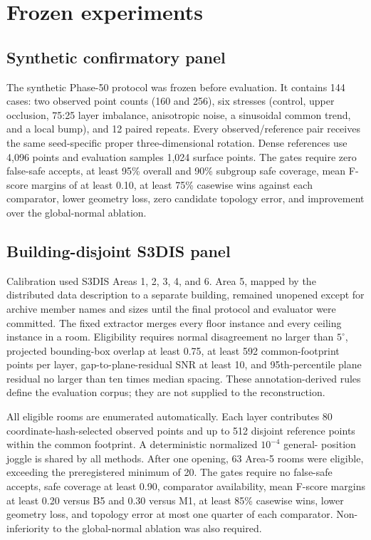 \documentclass[12pt,a4paper]{article}
\begin{document}
\section{Frozen experiments}

\subsection{Synthetic confirmatory panel}

The synthetic Phase-50 protocol was frozen before evaluation. It contains 144
cases: two observed point counts (160 and 256), six stresses (control, upper
occlusion, 75:25 layer imbalance, anisotropic noise, a sinusoidal common trend,
and a local bump), and 12 paired repeats. Every observed/reference pair receives
the same seed-specific proper three-dimensional rotation. Dense references use
4,096 points and evaluation samples 1,024 surface points. The gates require zero
false-safe accepts, at least 95\% overall and 90\% subgroup safe coverage, mean
F-score margins of at least 0.10, at least 75\% casewise wins against each
comparator, lower geometry loss, zero candidate topology error, and improvement
over the global-normal ablation.

\subsection{Building-disjoint S3DIS panel}

Calibration used S3DIS Areas 1, 2, 3, 4, and 6. Area 5, mapped by the distributed
data description to a separate building, remained unopened except for archive
member names and sizes until the final protocol and evaluator were committed.
The fixed extractor merges every floor instance and every ceiling instance in a
room. Eligibility requires normal disagreement no larger than $5^{\circ}$,
projected bounding-box overlap at least 0.75, at least 592 common-footprint points
per layer, gap-to-plane-residual SNR at least 10, and 95th-percentile plane
residual no larger than ten times median spacing. These annotation-derived rules
define the evaluation corpus; they are not supplied to the reconstruction.

All eligible rooms are enumerated automatically. Each layer contributes 80
coordinate-hash-selected observed points and up to 512 disjoint reference points
within the common footprint. A deterministic normalized $10^{-4}$ general-
position joggle is shared by all methods. After one opening, 63 Area-5 rooms were
eligible, exceeding the preregistered minimum of 20. The gates require no
false-safe accepts, safe coverage at least 0.90, comparator availability, mean
F-score margins at least 0.20 versus B5 and 0.30 versus M1, at least 85\%
casewise wins, lower geometry loss, and topology error at most one quarter of
each comparator. Non-inferiority to the global-normal ablation was also required.
\end{document}
